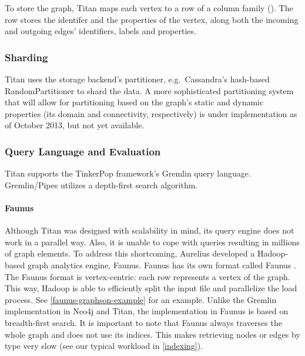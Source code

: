 
To store the graph, Titan maps each vertex to a row of a column family (). The row stores the identifer and the properties of the vertex, along both the incoming and outgoing edges' identifiers, labels and properties.

\subsubsection{Sharding}

Titan uses the storage backend's partitioner, e.g.\ Cassandra's hash-based RandomPartitioner to shard the data. A more sophisticated partitioning system that will allow for partitioning based on the graph's static and dynamic properties (its domain and connectivity, respectively) is under implementation as of October 2013, but not yet available.

\subsubsection{Query Language and Evaluation}

Titan supports the TinkerPop framework's Gremlin query language. Gremlin/Pipes utilizes a depth-first search algorithm.

\paragraph{Faunus}

Although Titan was designed with scalability in mind, its query engine does not work in a parallel way. Also, it is unable to cope with queries resulting in millions of graph elements. To address this shortcoming, Aurelius developed a Hadoop-based graph analytics engine, Faunus. Faunus has its own format called Faunus \graphson{}. The Faunus \graphson{} format is vertex-centric: each row represents a vertex of the graph. This way, Hadoop is able to efficiently split the input file and parallelize the load process. See \autoref{faunus-graphson-example} for an example. Unlike the Gremlin implementation in Neo4j and Titan, the implementation in Faunus is based on breadth-first search. It is important to note that Faunus always traverses the whole graph and does not use its indices. This makes retrieving nodes or edges by type very slow (see our typical workload in \autoref{indexing}).

